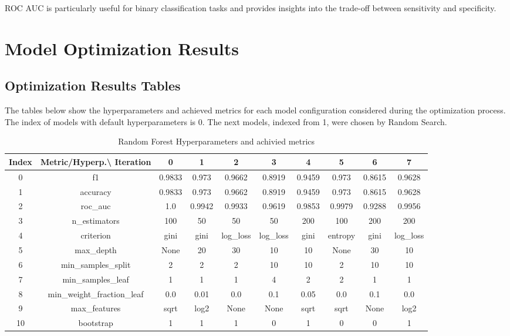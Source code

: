 \documentclass{article}%
\begin{document}
                ROC AUC is particularly useful for binary classification tasks and provides insights into the trade-off between sensitivity and specificity.
                

%
\newpage%
\section{Model Optimization Results}%
\label{sec:ModelOptimizationResults}%
\subsection{Optimization Results Tables}%
\label{subsec:OptimizationResultsTables}%
The tables below show the hyperparameters and achieved metrics for each model configuration considered during the optimization process. The index of models with default hyperparameters is 0. The next models, indexed from 1, were chosen by Random Search.%


\begin{table}[h!]%
\caption{Random Forest Hyperparameters and achivied metrics}%
\vspace{0.2cm}%
\centering%
\begin{tabular}{|c||c||c||c||c||c||c||c||c||c|}%
\hline%
Index&Metric/Hyperp.\textbackslash{} Iteration&0&1&2&3&4&5&6&7\\%
\hline%
0&f1&0.9833&0.973&0.9662&0.8919&0.9459&0.973&0.8615&0.9628\\%
1&accuracy&0.9833&0.973&0.9662&0.8919&0.9459&0.973&0.8615&0.9628\\%
2&roc\_auc&1.0&0.9942&0.9933&0.9619&0.9853&0.9979&0.9288&0.9956\\%
3&n\_estimators&100&50&50&50&200&100&200&200\\%
4&criterion&gini&gini&log\_loss&log\_loss&gini&entropy&gini&log\_loss\\%
5&max\_depth&None&20&30&10&10&None&30&10\\%
6&min\_samples\_split&2&2&2&10&10&2&10&10\\%
7&min\_samples\_leaf&1&1&1&4&2&2&1&1\\%
8&min\_weight\_fraction\_leaf&0.0&0.01&0.0&0.1&0.05&0.0&0.1&0.0\\%
9&max\_features&sqrt&log2&None&None&sqrt&sqrt&None&log2\\%
10&bootstrap&1&1&1&0&1&0&0&1\\%
\hline%
\end{tabular}%
\end{table}
\end{document}
